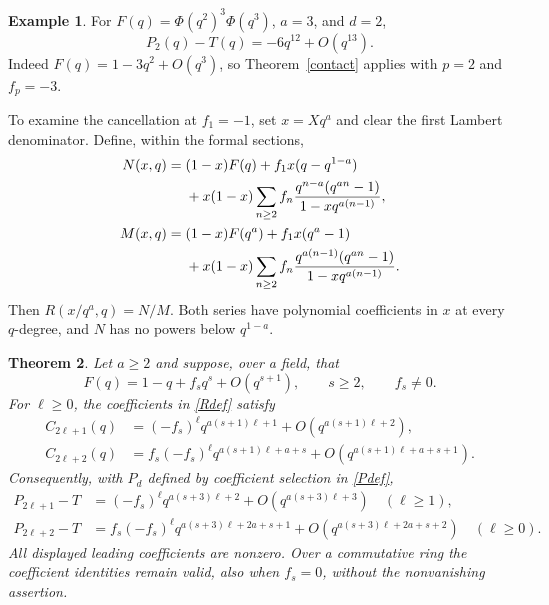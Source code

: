 \documentclass[11pt]{amsart}
\newtheorem{theorem}{Theorem}[section]
\theoremstyle{definition}
\newtheorem{example}[theorem]{Example}
\theoremstyle{remark}
\numberwithin{equation}{section}
\begin{document}
\begin{example}\label{mixedproduct}
For $F(q)=\Phi(q^2)^3\Phi(q^3)$, $a=3$, and $d=2$,
\[
 P_2(q)-T(q)=-6q^{12}+O(q^{13}).
\]
Indeed $F(q)=1-3q^2+O(q^3)$, so Theorem~\ref{contact} applies with $p=2$ and $f_p=-3$.
\end{example}

To examine the cancellation at $f_1=-1$, set $x=Xq^a$ and clear the first Lambert denominator. Define, within the formal sections,
\begin{align}
 N(x,q)={}&(1-x)F(q)+f_1x(q-q^{1-a})\notag\\
 &+x(1-x)\sum_{n\ge2}f_n
 \frac{q^{n-a}(q^{an}-1)}{1-xq^{a(n-1)}},\label{Ndef}\\
 M(x,q)={}&(1-x)F(q^a)+f_1x(q^a-1)\notag\\
 &+x(1-x)\sum_{n\ge2}f_n
 \frac{q^{a(n-1)}(q^{an}-1)}{1-xq^{a(n-1)}}.\label{Mdef}
\end{align}
Then $R(x/q^a,q)=N/M$. Both series have polynomial coefficients in $x$ at every $q$-degree, and $N$ has no powers below $q^{1-a}$.

\begin{theorem}\label{secondcontact}
Let $a\ge2$ and suppose, over a field, that
\[
 F(q)=1-q+f_s q^s+O(q^{s+1}),\qquad s\ge2,\qquad f_s\ne0.
\]
For $\ell\ge0$, the coefficients in \eqref{Rdef} satisfy
\begin{align}
 C_{2\ell+1}(q)&=(-f_s)^\ell q^{a(s+1)\ell+1}
                   +O(q^{a(s+1)\ell+2}),\label{Codd}\\
 C_{2\ell+2}(q)&=f_s(-f_s)^\ell q^{a(s+1)\ell+a+s}
                   +O(q^{a(s+1)\ell+a+s+1}).\label{Ceven}
\end{align}
Consequently, with $P_d$ defined by coefficient selection in \eqref{Pdef},
\begin{align}
 P_{2\ell+1}-T&=(-f_s)^\ell q^{a(s+3)\ell+2}
                   +O(q^{a(s+3)\ell+3})\quad(\ell\ge1),\label{Podd}\\
 P_{2\ell+2}-T&=f_s(-f_s)^\ell q^{a(s+3)\ell+2a+s+1}
                   +O(q^{a(s+3)\ell+2a+s+2})\quad(\ell\ge0).\label{Peven}
\end{align}
All displayed leading coefficients are nonzero. Over a commutative ring the coefficient identities remain valid, also when $f_s=0$, without the nonvanishing assertion.
\end{theorem}
\end{document}
